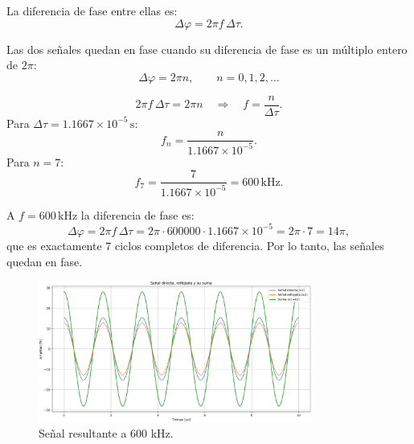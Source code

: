 \bigskip
La diferencia de fase entre ellas es:
\[
\Delta\varphi = 2\pi f \,\Delta\tau.
\]


Las dos señales quedan en fase cuando su diferencia de fase es un múltiplo entero de \(2\pi\):
\[
\Delta\varphi = 2\pi n,\qquad n=0,1,2,\dots
\]


\[
2\pi f \,\Delta\tau = 2\pi n \quad\Longrightarrow\quad f=\frac{n}{\Delta\tau}.
\]
\bigskip
Para \(\Delta\tau=1.1667\times10^{-5}\,\text{s}\):
\[
f_n=\frac{n}{1.1667\times10^{-5}}.
\]
\bigskip
Para \(n=7\):
\[
f_7=\frac{7}{1.1667\times10^{-5}}=600\,\text{kHz}.
\]
\bigskip

A \(f=600\,\text{kHz}\) la diferencia de fase es:
\[
\Delta\varphi=2\pi f \,\Delta\tau=2\pi\cdot 600000\cdot1.1667\times10^{-5}
=2\pi\cdot 7=14\pi,
\]
que es exactamente 7 ciclos completos de diferencia. Por lo tanto, las señales quedan en fase.


\begin{figure}[H]
\centering
\includegraphics[width=0.8\textwidth]{parte_teorica/grafico_600kHz.png}
\caption{Señal resultante a 600 kHz.}
\end{figure}
